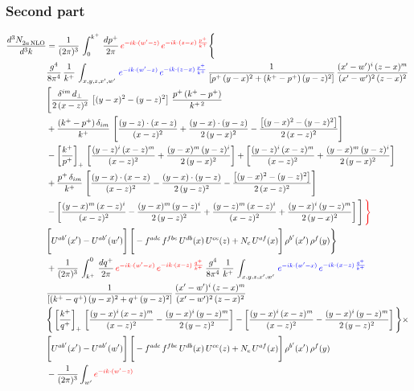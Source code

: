 \documentclass[9pt]{article}
\numberwithin{equation}{section}
\begin{document}
\subsubsection*{Second part}
\begin{align}
    \frac{d^{3}N_{2a\,\rm NLO}^{\rm}}{d^{3}k}  & =  \frac{1}{(2\pi)^{3}}\,\int_{0}^{k^{+}}\, \frac{dp^{+}}{2\pi} \, {\color{red}e^{-ik\cdot(w'-z)}\,e^{-ik\cdot (z-x)\,\frac{p^{+}}{k^{+}}}} \Bigg\{\notag \\ & \frac{g^{4}}{8\pi^{4}}\,\frac{1}{k^{+}}\,\int_{x,y,z,x',w'}\,{\color{blue}e^{-ik\cdot(w'-z)}\,e^{-ik\cdot (z-x)\,\frac{p^{+}}{k^{+}}}}\,\frac{1}{\left[p^{+}\,(y-x)^{2}+(k^{+}-p^{+})\,(y-z)^{2}\right]}\, \frac{(x'-w')^{i}\,(z-x)^{m}}{(x'-w')^{2}\,(z-x)^{2}} \notag \\ & \Bigg[\frac{\delta^{im}\,d_{\perp}}{2\,(x-z)^{2}}\,\left[(y-x)^{2}-(y-z)^{2}\right]\,\frac{p^{+}\,(k^{+}-p^{+})}{k^{+\,2}}\notag \\ & +\frac{(k^{+}-p^{+})\,\delta_{im}}{k^{+}}\,\left[\frac{(y-z)\cdot (x-z)}{(x-z)^{2}}+\frac{(y-x)\cdot (y-z)}{2\,(y-x)^{2}}-\frac{\left[(y-x)^{2}-(y-z)^{2}\right]}{2\,(x-z)^{2}}\right]\notag \\ & -\left[\frac{k^{+}}{p^{+}}\right]_{+}\,\left[\frac{(y-z)^{i}\,(x-z)^{m}}{(x-z)^{2}}+\frac{(y-x)^{m}\,(y-z)^{i}}{2\,(y-x)^{2}}\right]+ \left[\frac{(y-z)^{i}\,(x-z)^{m}}{(x-z)^{2}}+\frac{(y-x)^{m}\,(y-z)^{i}}{2\,(y-x)^{2}}\right]\notag \\ & +\frac{p^{+}\,\delta_{im}}{k^{+}}\,\left[\frac{(y-x)\cdot (x-z)}{(x-z)^{2}}-\frac{(y-x)\cdot (y-z)}{2\,(y-z)^{2}}-\frac{\left[(y-x)^{2}-(y-z)^{2}\right]}{2\,(x-z)^{2}}\right]\notag \\ &-\left[\frac{(y-x)^{m}\,(x-z)^{i}}{(x-z)^{2}}-\frac{(y-x)^{m}\,(y-z)^{i}}{2\,(y-z)^{2}}+\frac{(y-z)^{m}\,(x-z)^{i}}{(x-z)^{2}}+\frac{(y-x)^{i}\,(y-z)^{m}}{2\,(y-x)^{2}}\right]\Bigg]\,{\color{red}\Bigg\}} \notag \\ & \Bigg[U^{ab'}(x')-U^{ab'}(w')\Bigg]\,\Bigg[-f^{adc}\,f^{fbe}\,U^{db}(x)\,U^{ce}(z)+N_{c}\,U^{af}(x)\Bigg]\,\rho^{b'}(x')\,\rho^{f}(y)\Bigg\}\notag \\ & + \frac{1}{(2\pi)^{3}}\,\int^{0}_{k^{+}}\, \frac{dq^{+}}{2\pi} \, {\color{red}e^{-ik\cdot(w'-x)}\,e^{-ik\cdot (x-z)\,\frac{q^{+}}{k^{+}}}}\, \frac{g^{4}}{8\pi^{4}}\,\frac{1}{k^{+}}\, \int_{x,y,z,x',w'}\,{\color{blue}e^{-ik\cdot(w'-x)}\,e^{-ik\cdot (x-z)\,\frac{q^{+}}{k^{+}}}}\notag \\ & \frac{1}{\left[(k^{+}-q^{+})\,(y-x)^{2}+q^{+}\,(y-z)^{2}\right]}\, \frac{(x'-w')^{i}\,(z-x)^{m}}{(x'-w')^{2}\,(z-x)^{2}} \notag \\ &\Bigg\{\left[\frac{k^{+}}{q^{+}}\right]_{+}\,\left[\frac{(y-x)^{i}\,(x-z)^{m}}{(x-z)^{2}}-\frac{(y-x)^{i}\,(y-z)^{m}}{2\,(y-z)^{2}}\right] -\left[\frac{(y-x)^{i}\,(x-z)^{m}}{(x-z)^{2}}-\frac{(y-x)^{i}\,(y-z)^{m}}{2\,(y-z)^{2}}\right]\Bigg\}\times\,\notag \\ & \Bigg[U^{ab'}(x')-U^{ab'}(w')\Bigg]\,\Bigg[-f^{adc}\,f^{fbe}\,U^{db}(x)\,U^{ce}(z)+N_{c}\,U^{af}(x)\Bigg]\,\rho^{b'}(x')\,\rho^{f}(y)\notag \\ & - \frac{1}{(2\pi)^{3}}  \int_{w^\prime} {\color{red}e^{-ik\cdot(w'-z)}}\, 
\end{align}
\end{document}
